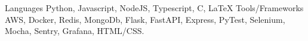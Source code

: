 \begin{cvskills}
  \cvskill
  {Languages}
  {Python, Javascript, NodeJS, Typescript, C, \LaTeX}
  \cvskill
  {Tools/Frameworks}
  {AWS, Docker, Redis, MongoDb, Flask, FastAPI, Express, PyTest, Selenium, Mocha, Sentry, Grafana, HTML/CSS.}
\end{cvskills}